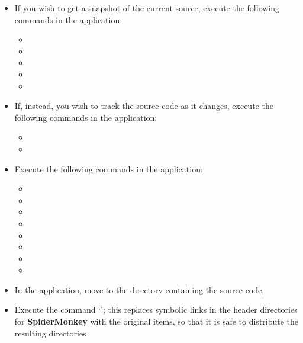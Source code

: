 \tertiaryEnd
{}
\begin{itemize}
\item If you wish to get a snapshot of the current source, execute the following
commands in the  application:
\begin{itemize}
\item {}
\item\exSp{}
\item\exSp{}
\item\exSp{}
\item\exSp{}
\end{itemize}
\item\exSp{}If, instead, you wish to track the source code as it changes, execute the
following commands in the  application:
\begin{itemize}
\item {}
\item\exSp{}
\end{itemize}
\item\exSp{}Execute the following commands in the  application:
\begin{itemize}
\item \exSp{}
\item\exSp{}
\item\exSp{}
\item\exSp{}
\item\exSp{}
\item\exSp{}
\item\exSp{}
\item\exSp{}
\end{itemize}
\item\exSp{}In the  application, move to the directory containing the
\mplusm{} source code, 
\item\exSp{}Execute the command `'; this replaces symbolic links in the
header directories for \textbf{SpiderMonkey} with the original items, so that it is safe
to distribute the resulting directories
\end{itemize}
